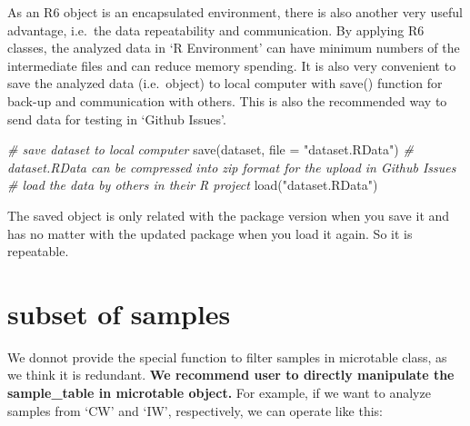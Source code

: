 \documentclass[
]{book}
\newenvironment{Shaded}{\begin{snugshade}}{\end{snugshade}}
\newcommand{\AttributeTok}[1]{\textcolor[rgb]{0.77,0.63,0.00}{#1}}
\newcommand{\CommentTok}[1]{\textcolor[rgb]{0.56,0.35,0.01}{\textit{#1}}}
\newcommand{\FunctionTok}[1]{\textcolor[rgb]{0.00,0.00,0.00}{#1}}
\newcommand{\NormalTok}[1]{#1}
\newcommand{\OtherTok}[1]{\textcolor[rgb]{0.56,0.35,0.01}{#1}}
\newcommand{\SpecialCharTok}[1]{\textcolor[rgb]{0.00,0.00,0.00}{#1}}
\newcommand{\StringTok}[1]{\textcolor[rgb]{0.31,0.60,0.02}{#1}}
\begin{document}
As an R6 object is an encapsulated environment, there is also another very useful advantage, i.e.~the data repeatability and communication.
By applying R6 classes, the analyzed data in `R Environment' can have minimum numbers of the intermediate files and can reduce memory spending.
It is also very convenient to save the analyzed data (i.e.~object) to local computer with save() function for back-up and communication with others.
This is also the recommended way to send data for testing in `Github Issues'.

\begin{Shaded}
\begin{Highlighting}[]
\CommentTok{\# save \textquotesingle{}dataset\textquotesingle{} to local computer}
\FunctionTok{save}\NormalTok{(dataset, }\AttributeTok{file =} \StringTok{"dataset.RData"}\NormalTok{)}
\CommentTok{\# dataset.RData can be compressed into zip format for the upload in \textquotesingle{}Github Issues\textquotesingle{}}
\CommentTok{\# load the data by others in their R project}
\FunctionTok{load}\NormalTok{(}\StringTok{"dataset.RData"}\NormalTok{)}
\end{Highlighting}
\end{Shaded}

The saved object is only related with the package version when you save it and has no matter with the updated package when you load it again.
So it is repeatable.

\hypertarget{subset-of-samples}{%
\section{subset of samples}\label{subset-of-samples}}

We donnot provide the special function to filter samples in microtable class, as we think it is redundant.
\textbf{We recommend user to directly manipulate the sample\_table in microtable object.}
For example, if we want to analyze samples from `CW' and `IW', respectively, we can operate like this:

\begin{Shaded}
\end{Shaded}
\end{document}

